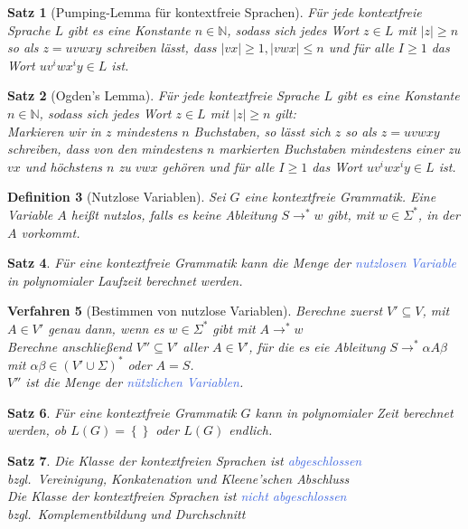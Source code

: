 \documentclass[11pt]{scrartcl}
\newcommand{\tcol}[1]{\textcolor{RoyalBlue}{#1}}
\newcommand{\set}[1]{\left\lbrace #1\right\rbrace}
\theoremstyle{break}
\newtheorem{satz}{Satz}[section]
\newtheorem{defi}[satz]{Definition}
\newtheorem{verf}[satz]{Verfahren}
\begin{document}
    \begin{satz}[Pumping-Lemma für kontextfreie Sprachen]
        Für jede kontextfreie Sprache $L$ gibt es eine Konstante $n\in\mathbb{N}$, sodass sich jedes Wort $z\in L$ mit $|z|\geq n$ so als $z=uvwxy$ schreiben lässt, dass $|vx|\geq 1,|vwx|\leq n$ und für alle $I\geq 1$ das Wort $uv^{i}wx^{i}y\in L$ ist.
    \end{satz}

    \begin{satz}[Ogden's Lemma]
        Für jede kontextfreie Sprache $L$ gibt es eine Konstante $n\in\mathbb{N}$, sodass sich jedes Wort $z\in L$ mit $|z|\geq n$ gilt:\\
        Markieren wir in $z$ mindestens $n$ Buchstaben, so lässt sich $z$ so als $z=uvwxy$ schreiben, dass von den mindestens $n$ markierten Buchstaben mindestens einer zu $vx$ und höchstens $n$ zu $vwx$ gehören und für alle $I\geq 1$ das Wort $uv^{i}wx^{i}y\in L$ ist.
    \end{satz}

    \begin{defi}[Nutzlose Variablen]
        Sei $G$ eine kontextfreie Grammatik.
        Eine Variable $A$ heißt nutzlos, falls es keine Ableitung $S\rightarrow^* w$ gibt, mit $w\in\Sigma^*$, in der $A$ vorkommt.
    \end{defi}

    \begin{satz}
        Für eine kontextfreie Grammatik kann die Menge der \tcol{nutzlosen Variable} in polynomialer Laufzeit berechnet werden.
    \end{satz}

    \begin{verf}[Bestimmen von nutzlose Variablen]
        Berechne zuerst $V'\subseteq V$, mit $A\in V'$ genau dann, wenn es $w\in\Sigma^*$ gibt mit $A\rightarrow^*w$\\
        Berechne anschließend $V''\subseteq V'$ aller $A\in V'$, für die es eie Ableitung $S\rightarrow^*\alpha A\beta$ mit $\alpha\beta\in(V'\cup\Sigma)^*$ oder $A=S$.\\
        $V''$ ist die Menge der \tcol{nützlichen Variablen}.
    \end{verf}

    \begin{satz}
        Für eine kontextfreie Grammatik $G$ kann in polynomialer Zeit berechnet werden, ob $L(G)=\set{}$ oder $L(G)$ endlich.
    \end{satz}

    \begin{satz}
        Die Klasse der kontextfreien Sprachen ist \tcol{abgeschlossen} bzgl.\ Vereinigung, Konkatenation und Kleene'schen Abschluss\\
        Die Klasse der kontextfreien Sprachen ist \tcol{nicht abgeschlossen} bzgl.\ Komplementbildung und Durchschnitt\\
    \end{satz}
\end{document}
